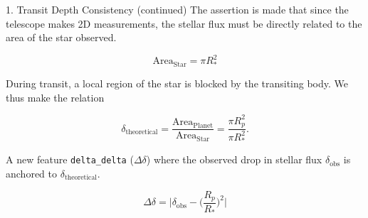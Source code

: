 \documentclass[9pt, aspectratio=169]{beamer}
\begin{document}
\begin{frame}{1. Transit Depth Consistency (continued)}
    The assertion is made that since the telescope makes 2D measurements, the stellar flux must be directly related to the area of the star observed.

    \begin{equation}
        \text{Area}_\text{Star} = \pi R_*^2
    \end{equation}

    During transit, a local region of the star is blocked by the transiting body. We thus make the relation

    \begin{equation}
        \delta_\text{theoretical}   = \frac{\text{Area}_\text{Planet}}{\text{Area}_\text{Star}}
                                    = \frac{\pi R_p^2}{\pi R_*^2}.
    \end{equation}

    A new feature \texttt{delta\_delta} ($\Delta\delta$) where the observed drop in stellar flux $\delta_\text{obs}$ is anchored to $\delta_\text{theoretical}$.

    \begin{equation}
        \Delta\delta = \Bigg|\delta_\text{obs} - \bigg(\frac{R_p}{R_*}\bigg)^2 \Bigg|
    \end{equation}
    
\end{frame}
\end{document}
